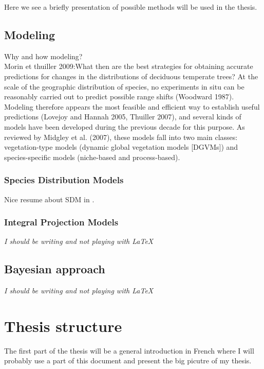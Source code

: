 Here we see a briefly presentation of possible methods will be used in the thesis.

\subsection*{Modeling}

Why and how modeling?\\
Morin et thuiller 2009:{What then are the best strategies for obtaining accurate predictions for changes in the distributions of deciduous temperate trees? At the scale of the geographic distribution of species, no experiments in situ can be reasonably carried out to predict possible range shifts (Woodward 1987). Modeling therefore appears the most feasible and efficient way to establish useful predictions (Lovejoy and Hannah 2005, Thuiller 2007), and several kinds of models have been developed during the previous decade for this purpose. As reviewed by Midgley et al. (2007), these models fall into two main classes: vegetation-type models (dynamic global vegetation models [DGVMs]) and species-specific models (niche-based and process-based).}

\subsubsection*{Species Distribution Models}\label{sdm}

Nice resume about SDM in \citet{Moran-Ordonez2016}.

\subsubsection*{Integral Projection Models}

\textit{I should be writing and not playing with \LaTeX}

\subsection*{Bayesian approach}

\textit{I should be writing and not playing with \LaTeX}

\section{Thesis structure}

The first part of the thesis will be a general introduction in French where  I will probably use a part of this document and present the big picutre of my thesis.

